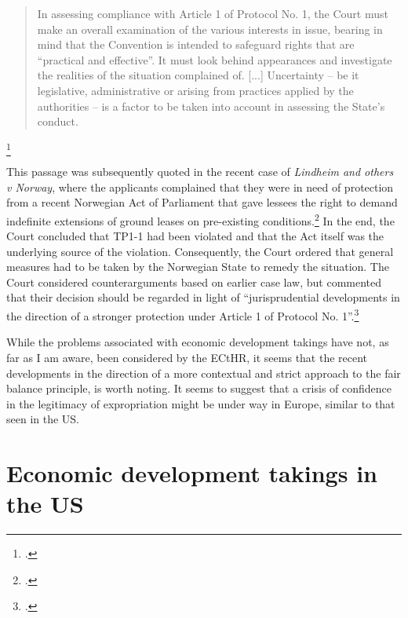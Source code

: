 \begin{quote}
In assessing compliance with Article 1 of Protocol No. 1, the Court must make an overall examination of the various interests in issue, bearing in mind that the Convention is 	intended to safeguard rights that are ``practical and effective''. It must look behind 	appearances and investigate the realities of the situation complained of. [...] Uncertainty -- be it legislative, administrative or arising from practices applied by the authorities -- is a factor to be taken into account in assessing the State’s conduct.
\end{quote}\footcite[151]{hutten06}

This passage was subsequently quoted in the recent case of {\it Lindheim and others v Norway}, where the applicants complained that they were in need of protection from a recent Norwegian Act of Parliament that gave lessees the right to demand indefinite extensions of ground leases on pre-existing conditions.\footcite[119]{lindheim12}  In the end, the Court concluded that TP1-1 had been violated and that the Act itself was the underlying source of the violation. Consequently, the Court ordered that general measures had to be taken by the Norwegian State to remedy the situation. The Court considered counterarguments based on earlier case law, but commented that their decision should be regarded in light of ``jurisprudential developments in the direction of a stronger protection under Article 1 of Protocol No. 1''.\footcite[135]{lindheim12}

While the problems associated with economic development takings have not, as far as I am aware, been considered by the ECtHR, it seems that the recent developments in the direction of a more contextual and strict approach to the fair balance principle, is worth noting. It seems to suggest that a crisis of confidence in the legitimacy of expropriation might be under way in Europe, similar to that seen in the US.

\section{Economic development takings in the US}


